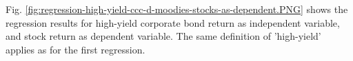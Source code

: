 Fig. \ref{fig:regression-high-yield-ccc-d-moodies-stocks-as-dependent.PNG} shows the regression results for high-yield corporate bond return as independent variable, and stock return as dependent variable. The same definition of 'high-yield' applies as for the first regression. 






